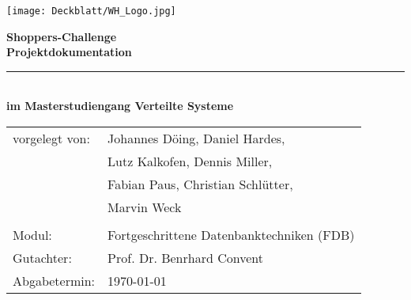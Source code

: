 \thispagestyle{plain}
\begin{titlepage}

\begin{center}

\texttt{[image: Deckblatt/WH\_Logo.jpg]}

\vspace{2cm}

\Huge{\textbf{Shoppers-Challenge}}\\[1.5ex]
\Large{\textbf{Projektdokumentation}}
\rule{\textwidth}{0.4pt}\\[3.0ex]

\large{\textbf{im Masterstudiengang Verteilte Systeme}}\\[3.0ex]

\normalsize
\begin{tabular}{ll}\\
	vorgelegt von: 
	& \quad Johannes Döing, Daniel Hardes, \\[1.2ex]
	& \quad Lutz Kalkofen, Dennis Miller, \\[1.2ex]
	& \quad Fabian Paus, Christian Schlütter,\\[1.2ex]
	& \quad Marvin Weck \\[1.2ex]
	& \quad \\[1.2ex]
	Modul:  & \quad Fortgeschrittene Datenbanktechniken (FDB) \\[1.2ex]
	Gutachter:  & \quad Prof. Dr. Benrhard Convent \\[1.2ex]
	Abgabetermin:  & \quad \today\\[1.2ex]
\end{tabular}

\end{center}

\end{titlepage}
